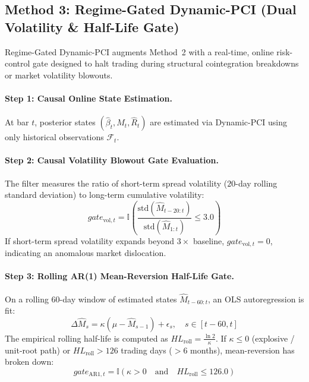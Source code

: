 \documentclass[11pt, a4paper]{article}
\begin{document}
\subsection{Method 3: Regime-Gated Dynamic-PCI (Dual Volatility \& Half-Life Gate)}
\label{sec:method_gated}
Regime-Gated Dynamic-PCI augments Method~2 with a real-time, online risk-control gate designed to halt trading during structural cointegration breakdowns or market volatility blowouts.

\paragraph{Step 1: Causal Online State Estimation.}
At bar $t$, posterior states $(\hat{\beta}_t, \hat{M}_t, \hat{R}_t)$ are estimated via Dynamic-PCI using only historical observations $\mathcal{F}_t$.

\paragraph{Step 2: Causal Volatility Blowout Gate Evaluation.}
The filter measures the ratio of short-term spread volatility ($20$-day rolling standard deviation) to long-term cumulative volatility:
\begin{equation}
    gate_{\text{vol}, t} = \mathbb{I}\left( \frac{\text{std}(\hat{M}_{t-20:t})}{\text{std}(\hat{M}_{1:t})} \le 3.0 \right)
\end{equation}
If short-term spread volatility expands beyond $3\times$ baseline, $gate_{\text{vol}, t} = 0$, indicating an anomalous market dislocation.

\paragraph{Step 3: Rolling AR(1) Mean-Reversion Half-Life Gate.}
On a rolling 60-day window of estimated states $\hat{M}_{t-60:t}$, an OLS autoregression is fit:
\begin{equation}
    \Delta \hat{M}_s = \kappa (\mu - \hat{M}_{s-1}) + \epsilon_s, \quad s \in [t-60, t]
\end{equation}
The empirical rolling half-life is computed as $HL_{\text{roll}} = \frac{\ln 2}{\kappa}$. If $\kappa \le 0$ (explosive / unit-root path) or $HL_{\text{roll}} > 126$ trading days ($>6$ months), mean-reversion has broken down:
\begin{equation}
    gate_{\text{AR1}, t} = \mathbb{I}\left( \kappa > 0 \quad \text{and} \quad HL_{\text{roll}} \le 126.0 \right)
\end{equation}
\end{document}
